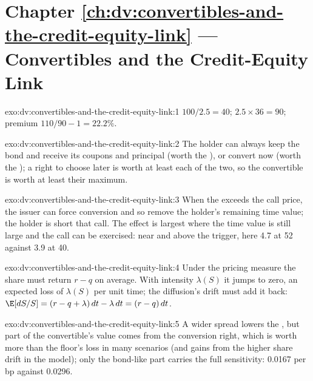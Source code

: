 \section*{Chapter \ref{ch:dv:convertibles-and-the-credit-equity-link} --- Convertibles and the Credit-Equity Link}

\begin{solution}{exo:dv:convertibles-and-the-credit-equity-link:1}
 $100/2.5=40$;  $2.5\times36=90$; premium $110/90-1=22.2\%$.
\end{solution}

\begin{solution}{exo:dv:convertibles-and-the-credit-equity-link:2}
The holder can always keep the bond and receive its coupons and principal (worth the ), or convert now (worth the );
a right to choose later is worth at least each of the two, so the convertible is worth at least their maximum.
\end{solution}

\begin{solution}{exo:dv:convertibles-and-the-credit-equity-link:3}
When the  exceeds the call price, the issuer can force conversion and so remove the holder's remaining time value; the holder is
short that call. The effect is largest where the time value is still large and the call can be exercised: near and above the trigger, here 4.7 at
52 against 3.9 at 40.
\end{solution}

\begin{solution}{exo:dv:convertibles-and-the-credit-equity-link:4}
Under the pricing measure the share must return $r-q$ on average. With intensity $\lambda(S)$ it jumps to zero, an expected loss of $\lambda(S)$ per
unit time; the diffusion's drift must add it back: $\E[dS/S]=(r-q+\lambda)\,dt-\lambda\,dt=(r-q)\,dt$.
\end{solution}

\begin{solution}{exo:dv:convertibles-and-the-credit-equity-link:5}
A wider spread lowers the , but part of the convertible's value comes from the conversion right, which is worth more than the floor's
loss in many scenarios (and gains from the higher share drift in the model); only the bond-like part carries the full sensitivity: 0.0167 per bp
against 0.0296.
\end{solution}

